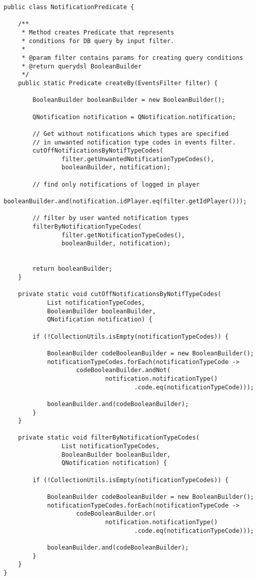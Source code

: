 \documentclass[12pt]{article}
\begin{document}
\clearpage

\begin{lstlisting}
public class NotificationPredicate {

    /**
     * Method creates Predicate that represents
     * conditions for DB query by input filter.
     *
     * @param filter contains params for creating query conditions
     * @return querydsl BooleanBuilder
     */
    public static Predicate createBy(EventsFilter filter) {

        BooleanBuilder booleanBuilder = new BooleanBuilder();

        QNotification notification = QNotification.notification;

        // Get without notifications which types are specified
        // in unwanted notification type codes in events filter.
        cutOffNotificationsByNotifTypeCodes(
                filter.getUnwantedNotificationTypeCodes(),
                booleanBuilder, notification);

        // find only notifications of logged in player
        booleanBuilder.and(notification.idPlayer.eq(filter.getIdPlayer()));

        // filter by user wanted notification types
        filterByNotificationTypeCodes(
                filter.getNotificationTypeCodes(),
                booleanBuilder, notification);


        return booleanBuilder;
    }

    private static void cutOffNotificationsByNotifTypeCodes(
            List notificationTypeCodes,
            BooleanBuilder booleanBuilder,
            QNotification notification) {

        if (!CollectionUtils.isEmpty(notificationTypeCodes)) {

            BooleanBuilder codeBooleanBuilder = new BooleanBuilder();
            notificationTypeCodes.forEach(notificationTypeCode ->
                    codeBooleanBuilder.andNot(
                            notification.notificationType()
                                    .code.eq(notificationTypeCode)));

            booleanBuilder.and(codeBooleanBuilder);
        }
    }

    private static void filterByNotificationTypeCodes(
                List notificationTypeCodes,
                BooleanBuilder booleanBuilder,
                QNotification notification) {

        if (!CollectionUtils.isEmpty(notificationTypeCodes)) {

            BooleanBuilder codeBooleanBuilder = new BooleanBuilder();
            notificationTypeCodes.forEach(notificationTypeCode ->
                    codeBooleanBuilder.or(
                            notification.notificationType()
                                    .code.eq(notificationTypeCode)));

            booleanBuilder.and(codeBooleanBuilder);
        }
    }
}
\end{lstlisting}
\end{document}
